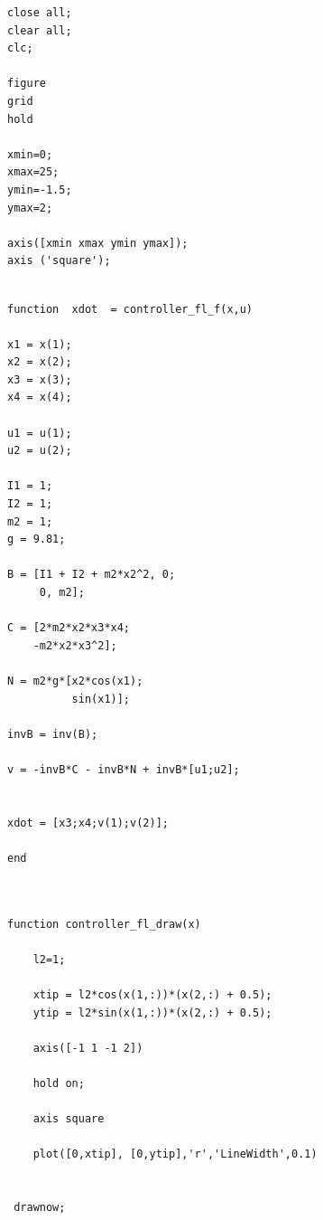 \documentclass{article}
\begin{document}
\begin{itemize}
\begin{tcolorbox}
\begin{scriptsize}
\begin{verbatim}
close all; 
clear all; 
clc;

figure
grid
hold

xmin=0;
xmax=25;
ymin=-1.5;
ymax=2;

axis([xmin xmax ymin ymax]); 
axis ('square');

\end{verbatim}
\end{scriptsize}
\end{tcolorbox}

\begin{tcolorbox}
[
title={File \texttt{controller\_fl\_f.m}}      
]
\begin{scriptsize}
\begin{verbatim}

function  xdot  = controller_fl_f(x,u)

x1 = x(1);
x2 = x(2);
x3 = x(3);
x4 = x(4);

u1 = u(1);
u2 = u(2);

I1 = 1;
I2 = 1;
m2 = 1;
g = 9.81;

B = [I1 + I2 + m2*x2^2, 0;
     0, m2];

C = [2*m2*x2*x3*x4;
    -m2*x2*x3^2];

N = m2*g*[x2*cos(x1);
          sin(x1)];

invB = inv(B);

v = -invB*C - invB*N + invB*[u1;u2];

 
xdot = [x3;x4;v(1);v(2)];

end


\end{verbatim}
\end{scriptsize}
\end{tcolorbox}

\begin{tcolorbox}
[
title={File \texttt{controller\_fl\_draw.m}}      
]
\begin{scriptsize}
\begin{verbatim}

function controller_fl_draw(x)

    l2=1;

    xtip = l2*cos(x(1,:))*(x(2,:) + 0.5);
    ytip = l2*sin(x(1,:))*(x(2,:) + 0.5);

    axis([-1 1 -1 2])

    hold on;

    axis square

    plot([0,xtip], [0,ytip],'r','LineWidth',0.1)
 

 drawnow;


\end{verbatim}
\end{scriptsize}
\end{tcolorbox}
\end{itemize}
\end{document}
